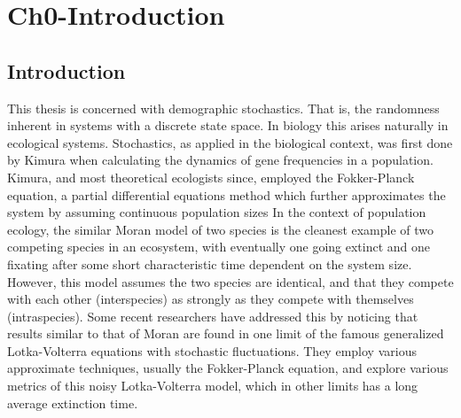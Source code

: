 \chapter{Ch0-Introduction}

\section{Introduction}
This thesis is concerned with demographic stochastics. That is, the randomness inherent in systems with a discrete state space. 
In biology this arises naturally in ecological systems. 
Stochastics, as applied in the biological context, was first done by Kimura when calculating the dynamics of gene frequencies in a population. %
Kimura, and most theoretical ecologists since, employed the Fokker-Planck equation, a partial differential equations method which further approximates the system by assuming continuous population sizes %
In the context of population ecology, the similar Moran model of two species is the cleanest example of two competing species in an ecosystem, with eventually one going extinct and one fixating after some short characteristic time dependent on the system size. 
However, this model assumes the two species are identical, and that they compete with each other (interspecies) as strongly as they compete with themselves (intraspecies). 
Some recent researchers have addressed this by noticing that results similar to that of Moran are found in one limit of the famous generalized Lotka-Volterra equations with stochastic fluctuations. 
They employ various approximate techniques, usually the Fokker-Planck equation, and explore various metrics of this noisy Lotka-Volterra model, which in other limits has a long average extinction time. 
